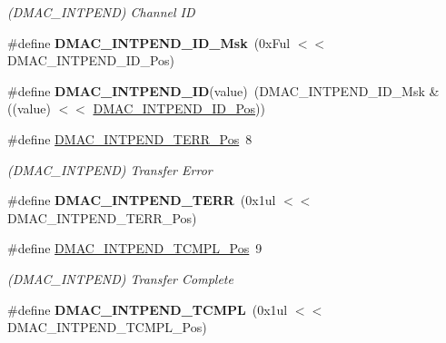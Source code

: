\begin{DoxyCompactItemize}
\begin{DoxyCompactList}\small\item\em (D\+M\+A\+C\+\_\+\+I\+N\+T\+P\+E\+N\+D) Channel I\+D \end{DoxyCompactList}\item 
\hypertarget{group___s_a_m_l21___d_m_a_c_ga874d0e36d1469d31c4ca83b7b33fd641}{}\#define {\bfseries D\+M\+A\+C\+\_\+\+I\+N\+T\+P\+E\+N\+D\+\_\+\+I\+D\+\_\+\+Msk}~(0x\+Ful $<$$<$ D\+M\+A\+C\+\_\+\+I\+N\+T\+P\+E\+N\+D\+\_\+\+I\+D\+\_\+\+Pos)\label{group___s_a_m_l21___d_m_a_c_ga874d0e36d1469d31c4ca83b7b33fd641}

\item 
\hypertarget{group___s_a_m_l21___d_m_a_c_ga22cf6a3c319da782de4e3b63244f4ce6}{}\#define {\bfseries D\+M\+A\+C\+\_\+\+I\+N\+T\+P\+E\+N\+D\+\_\+\+I\+D}(value)~(D\+M\+A\+C\+\_\+\+I\+N\+T\+P\+E\+N\+D\+\_\+\+I\+D\+\_\+\+Msk \& ((value) $<$$<$ \hyperlink{group___s_a_m_l21___d_m_a_c_ga725ca18c42f6b625eec02028ff6f7f3a}{D\+M\+A\+C\+\_\+\+I\+N\+T\+P\+E\+N\+D\+\_\+\+I\+D\+\_\+\+Pos}))\label{group___s_a_m_l21___d_m_a_c_ga22cf6a3c319da782de4e3b63244f4ce6}

\item 
\hypertarget{group___s_a_m_l21___d_m_a_c_gaf7afd635eb1395716090b10818b9d27c}{}\#define \hyperlink{group___s_a_m_l21___d_m_a_c_gaf7afd635eb1395716090b10818b9d27c}{D\+M\+A\+C\+\_\+\+I\+N\+T\+P\+E\+N\+D\+\_\+\+T\+E\+R\+R\+\_\+\+Pos}~8\label{group___s_a_m_l21___d_m_a_c_gaf7afd635eb1395716090b10818b9d27c}

\begin{DoxyCompactList}\small\item\em (D\+M\+A\+C\+\_\+\+I\+N\+T\+P\+E\+N\+D) Transfer Error \end{DoxyCompactList}\item 
\hypertarget{group___s_a_m_l21___d_m_a_c_ga1ff204e4eb890e0e39c011e0c399787b}{}\#define {\bfseries D\+M\+A\+C\+\_\+\+I\+N\+T\+P\+E\+N\+D\+\_\+\+T\+E\+R\+R}~(0x1ul $<$$<$ D\+M\+A\+C\+\_\+\+I\+N\+T\+P\+E\+N\+D\+\_\+\+T\+E\+R\+R\+\_\+\+Pos)\label{group___s_a_m_l21___d_m_a_c_ga1ff204e4eb890e0e39c011e0c399787b}

\item 
\hypertarget{group___s_a_m_l21___d_m_a_c_gaa75fce9c10a99dc8a6c25521c5e4596d}{}\#define \hyperlink{group___s_a_m_l21___d_m_a_c_gaa75fce9c10a99dc8a6c25521c5e4596d}{D\+M\+A\+C\+\_\+\+I\+N\+T\+P\+E\+N\+D\+\_\+\+T\+C\+M\+P\+L\+\_\+\+Pos}~9\label{group___s_a_m_l21___d_m_a_c_gaa75fce9c10a99dc8a6c25521c5e4596d}

\begin{DoxyCompactList}\small\item\em (D\+M\+A\+C\+\_\+\+I\+N\+T\+P\+E\+N\+D) Transfer Complete \end{DoxyCompactList}\item 
\hypertarget{group___s_a_m_l21___d_m_a_c_ga7d2293be119e5f47bb0e3d70404caded}{}\#define {\bfseries D\+M\+A\+C\+\_\+\+I\+N\+T\+P\+E\+N\+D\+\_\+\+T\+C\+M\+P\+L}~(0x1ul $<$$<$ D\+M\+A\+C\+\_\+\+I\+N\+T\+P\+E\+N\+D\+\_\+\+T\+C\+M\+P\+L\+\_\+\+Pos)\label{group___s_a_m_l21___d_m_a_c_ga7d2293be119e5f47bb0e3d70404caded}


\end{DoxyCompactItemize}
